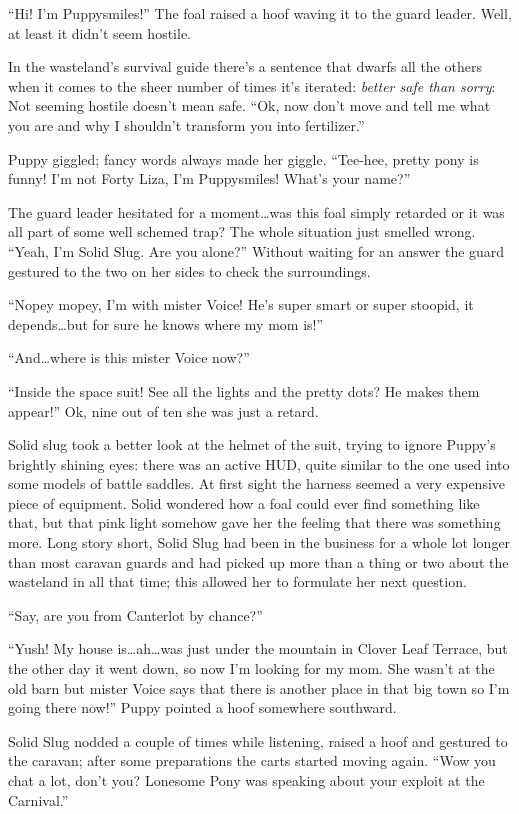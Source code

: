 ``Hi! I'm Puppysmiles!'' The foal raised a hoof waving it to the guard leader. Well, at least it didn't seem hostile.

In the wasteland's survival guide there's a sentence that dwarfs all the others when it comes to the sheer number of times it's iterated: \emph{better safe than sorry}: Not seeming hostile doesn't mean safe. ``Ok, now don't move and tell me what you are and why I shouldn't transform you into fertilizer.''

Puppy giggled; fancy words always made her giggle. ``Tee-hee, pretty pony is funny! I'm not Forty Liza, I'm Puppysmiles! What's your name?''

The guard leader hesitated for a moment\dots was this foal simply retarded or it was all part of some well schemed trap? The whole situation just smelled wrong. ``Yeah, I'm Solid Slug. Are you alone?'' Without waiting for an answer the guard gestured to the two on her sides to check the surroundings.

``Nopey mopey, I'm with mister Voice! He's super smart or super stoopid, it depends\dots but for sure he knows where my mom is!''

``And\dots where is this mister Voice now?''

``Inside the space suit! See all the lights and the pretty dots? He makes them appear!'' Ok, nine out of ten she was just a retard.

Solid slug took a better look at the helmet of the suit, trying to ignore Puppy's brightly shining eyes: there was an active HUD, quite similar to the one used into some models of battle saddles. At first sight the harness seemed a very expensive piece of equipment. Solid wondered how a foal could ever find something like that, but that pink light somehow gave her the feeling that there was something more. Long story short, Solid Slug had been in the business for a whole lot longer than most caravan guards and had picked up more than a thing or two about the wasteland in all that time; this allowed her to formulate her next question.

``Say, are you from Canterlot by chance?''

``Yush! My house is\dots ah\dots was just under the mountain in Clover Leaf Terrace, but the other day it went down, so now I'm looking for my mom. She wasn't at the old barn but mister Voice says that there is another place in that big town so I'm going there now!'' Puppy pointed a hoof somewhere southward.

Solid Slug nodded a couple of times while listening, raised a hoof and gestured to the caravan; after some preparations the carts started moving again. ``Wow you chat a lot, don't you? Lonesome Pony was speaking about your exploit at the Carnival.''

